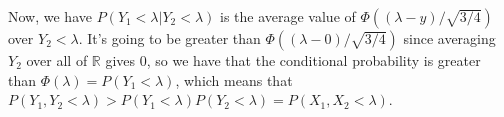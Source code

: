 \documentclass{article}
\newcommand{\openm}{\begin{pmatrix}}
\newcommand{\closem}{\end{pmatrix}}
\newcommand{\rn}{\mathbb{R}}
\begin{document}
Now, we have $P(Y_1<\lambda|Y_2<\lambda)$ is the average value of $\Phi((\lambda-y)/\sqrt{3/4})$ over $Y_2<\lambda$. It's going to be greater than $\Phi((\lambda-0)/\sqrt{3/4})$ since averaging $Y_2$ over all of $\rn$ gives $0$, so we have that the conditional probability is greater than $\Phi(\lambda)=P(Y_1<\lambda)$, which means that $P(Y_1,Y_2<\lambda)>P(Y_1<\lambda)P(Y_2<\lambda)=P(X_1,X_2<\lambda)$.

\end{document}
